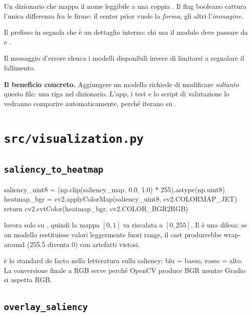 Un dizionario che mappa il nome leggibile a una coppia .
Il flag booleano cattura l'unica differenza fra le firme: il center prior vuole la \emph{forma},
gli altri l'\emph{immagine}.

Il prefisso \pyin{_} in  segnala che è un dettaglio interno: chi usa il modulo
deve passare da  e .

Il messaggio d'errore elenca i modelli disponibili invece di limitarsi a segnalare il fallimento.

\begin{nota}
\textbf{Il beneficio concreto.} Aggiungere un modello richiede di modificare \emph{soltanto}
questo file: una riga nel dizionario. L'app, i test e lo script di valutazione lo vedranno
comparire automaticamente, perché iterano su .
\end{nota}

\section{\texttt{src/visualization.py}}

\subsection{\texttt{saliency\_to\_heatmap}}

\begin{idebox}
\begin{pycode}
saliency_uint8 = (np.clip(saliency_map, 0.0, 1.0) * 255).astype(np.uint8)
heatmap_bgr = cv2.applyColorMap(saliency_uint8, cv2.COLORMAP_JET)
return cv2.cvtColor(heatmap_bgr, cv2.COLOR_BGR2RGB)
\end{pycode}
\end{idebox}

 lavora solo su , quindi la mappa $[0,1]$ va riscalata a
$[0,255]$. Il  è una difesa: se un modello restituisse valori leggermente fuori
range, il cast produrrebbe wrap-around (255.5 diventa 0) con artefatti vistosi.

 è lo standard de facto nella letteratura sulla saliency: blu = basso, rosso =
alto. La conversione finale a RGB serve perché OpenCV produce BGR mentre Gradio si aspetta RGB.

\subsection{\texttt{overlay\_saliency}}

